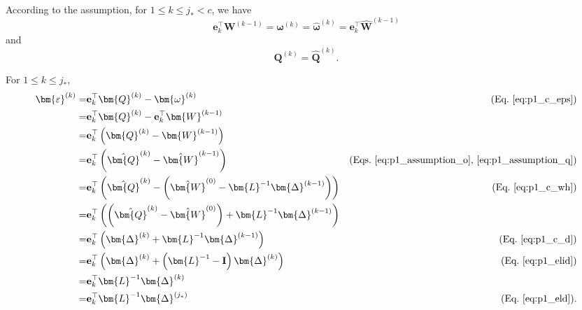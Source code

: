 \documentclass{article} %
\begin{document}
According to the assumption, for $1 \le k \le j_* < c$, we have
\begin{equation}
\mathbf{e}_{k}^\top \bm{W}^{(k-1)}
= \bm{\omega}^{(k)}
= \hat{\bm{\omega}}^{(k)}
= \mathbf{e}_{k}^\top \hat{\bm{W}}^{(k-1)}
\label{eq:p1_assumption_o}
\end{equation}
and
\begin{equation}
\bm{Q}^{(k)} = \hat{\bm{Q}}^{(k)} .
\label{eq:p1_assumption_q}
\end{equation}

For $1 \le k \le j_*$,
\begin{equation}
\begin{aligned}
\bm{\varepsilon}^{(k)}
= & \mathbf{e}_{k}^\top \bm{Q}^{(k)} - \bm{\omega}^{(k)} & \text{(Eq.~\ref{eq:p1_c_eps})} \\
= & \mathbf{e}_{k}^\top \bm{Q}^{(k)} - \mathbf{e}_{k}^\top \bm{W}^{(k-1)} \\
= & \mathbf{e}_{k}^\top \left( \bm{Q}^{(k)} - \bm{W}^{(k-1)} \right) \\
= & \mathbf{e}_{k}^\top \left( \hat{\bm{Q}}^{(k)} - \hat{\bm{W}}^{(k-1)} \right) & \text{(Eqs.~\ref{eq:p1_assumption_o},~\ref{eq:p1_assumption_q})} \\
= & \mathbf{e}_{k}^\top \left( \hat{\bm{Q}}^{(k)} - \left( \hat{\bm{W}}^{(0)} - \bm{L}^{-1} \bm{\Delta}^{(k-1)} \right) \right) & \text{(Eq.~\ref{eq:p1_c_wh})} \\
= & \mathbf{e}_{k}^\top \left( \left( \hat{\bm{Q}}^{(k)} - \hat{\bm{W}}^{(0)} \right) + \bm{L}^{-1} \bm{\Delta}^{(k-1)} \right) \\
= & \mathbf{e}_{k}^\top \left( \bm{\Delta}^{(k)} + \bm{L}^{-1} \bm{\Delta}^{(k-1)} \right) & \text{(Eq.~\ref{eq:p1_c_d})} \\
= & \mathbf{e}_{k}^\top \left( \bm{\Delta}^{(k)} + \left( \bm{L}^{-1} - \mathbf{I} \right) \bm{\Delta}^{(k)} \right) & \text{(Eq.~\ref{eq:p1_elid})} \\
= & \mathbf{e}_{k}^\top \bm{L}^{-1} \bm{\Delta}^{(k)} \\
= & \mathbf{e}_{k}^\top \bm{L}^{-1} \bm{\Delta}^{(j_*)} & \text{(Eq.~\ref{eq:p1_eld})} .
\end{aligned}
\label{eq:p1_eps}
\end{equation}
\end{document}
